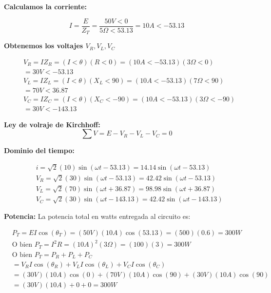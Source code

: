 \textbf{Calculamos la corriente:}

\begin{equation*}
	I=\frac{E}{Z_T}=\frac{50V<0}{5\Omega < 53.13}=10A< -53.13
\end{equation*}

\textbf{Obtenemos los voltajes $V_R,V_L,V_C$}

\begin{align*}
	 & V_R=IZ_R=(I<\theta)(R<0)=(10A< -53.13)(3\Omega <0)     \\
	 & =30V<-53.13                                            \\
	 & V_L=IZ_L=(I<\theta)(X_L<90)=(10A<-53.13)(7\Omega<90)   \\
	 & =70V<36.87                                             \\
	 & V_C=IZ_C=(I<\theta)(X_C<-90)=(10A<-53.13)(3\Omega<-90) \\
	 & =30V<-143.13
\end{align*}

\textbf{Ley de volraje de Kirchhoff:}
\begin{equation*}
	\sum V=E-V_R-V_L-V_C=0
\end{equation*}

\textbf{Dominio del tiempo:}

\begin{align*}
	 & i=\sqrt{2}(10)\sin(\omega t-53.13) = 14.14\sin(\omega t-53.13)    \\
	 & V_R=\sqrt{2}(30)\sin(\omega t-53.13) =42.42\sin(\omega t-53.13)   \\
	 & V_L=\sqrt{2}(70)\sin(\omega t+36.87) =98.98\sin(\omega t+36.87)   \\
	 & V_C=\sqrt{2}(30)\sin(\omega t-143.13) =42.42\sin(\omega t-143.13)
\end{align*}

\textbf{Potencia:} La potencia total en watts entregada al circuito es:

\begin{align*}
	 & P_T=E I\cos(\theta_T)=(50V)(10A)\cos(53.13)=(500)(0.6)=300W  \\
	 & \text{O bien } P_T=I^2R=(10A)^2(3\Omega)=(100)(3)=300W       \\
	 & \text{O bien } P_T=P_R+P_L+P_C                               \\
	 & =V_R I\cos(\theta_R)+V_L I\cos(\theta_L)+V_C I\cos(\theta_C) \\
	 & =(30V)(10A)\cos(0)+(70V)(10A)\cos(90)+(30V)(10A)\cos(90)     \\
	 & =(30V)(10A)+0+0=300W
\end{align*}

